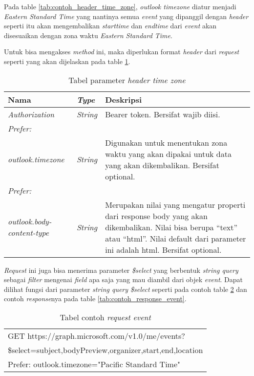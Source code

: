 \documentclass[a4paper,twoside]{article}
\begin{document}
\begin{enumerate}
Pada table \ref{tab:contoh_header_time_zone}, \textit{outlook timezone} diatur menjadi \textit{Eastern Standard Time} yang nantinya semua \textit{event} yang dipanggil dengan \textit{header} seperti itu akan mengembalikan \textit{starttime} dan \textit{endtime} dari \textit{event} akan disesuaikan dengan zona waktu \textit{Eastern Standard Time}. 

Untuk bisa mengakses \textit{method} ini, maka diperlukan format \textit{header} dari \textit{request} seperti yang akan dijelaskan pada table \ref{tab:parameter_header_time_zone}. 

\begin{table}[H]
	\centering 
	\caption{Tabel parameter \textit{header time zone}}
	\label{tab:parameter_header_time_zone}
	\begin{tabular}{|p{3cm}|p{3cm}|p{9cm}|}
	\hline
	 \textbf{Nama} & \textbf{\textit{Type}} & \textbf{Deskripsi}\\ \hline
	 \textit{Authorization} & \textit{String} & Bearer {token}. Bersifat wajib diisi. \\ \hline
	 \textit{Prefer:}& & \\
	 \textit{outlook.timezone} & \textit{String} & Digunakan untuk menentukan zona waktu yang akan dipakai untuk data yang akan dikembalikan. Bersifat optional. \\ \hline
	 \textit{Prefer:}& & \\
	 \textit{outlook.body-content-type} & \textit{String} & Merupakan nilai yang mengatur properti dari response body yang akan dikembalikan. Nilai bisa berupa ``text'' atau ``html''. Nilai default dari parameter ini adalah html. Bersifat optional. \\ \hline
	\hline
	\end{tabular}  
\end{table}

\textit{Request} ini juga bisa menerima parameter \textit{\$select} yang berbentuk \textit{string query} sebagai \textit{filter} mengenai \textit{field} apa saja yang mau diambil dari objek \textit{event}. Dapat dilihat fungsi dari parameter \textit{string query \$select} seperti pada contoh table \ref{tab:contoh_request_event} dan contoh \textit{response}nya pada table \ref{tab:contoh_response_event}. 

\begin{table}[H]
	\centering 
	\caption{Tabel contoh \textit{request event}}
	\label{tab:contoh_request_event}
	\begin{tabular}{|p{12cm}|}
	\hline
	GET https://graph.microsoft.com/v1.0/me/events?\\
	\$select=subject,bodyPreview,organizer,start,end,location\\
	Prefer: outlook.timezone="Pacific Standard Time"\\
	\hline
	\end{tabular}  
\end{table}


\end{enumerate}
\end{document}
